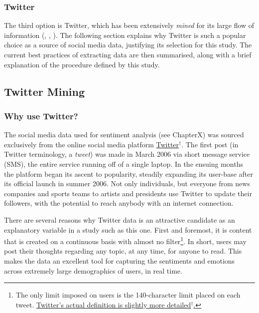 \documentclass{article}
\begin{document}
\subsubsection{Twitter}
\label{sec-1-1-3}
The third option is Twitter, which has been extensively \emph{mined} for its large flow of information (\cite{pak2010twitterMiningEx1}, \cite{bian2012towardsMiningEx2}, \cite{ediger2010massiveMiningEx3}). The following section explains why Twitter is such a popular choice as a source of social media data, justifying its selection for this study. The current best practices of extracting data are then summarised, along with a brief explanation of the procedure defined by this study.


\subsection{Twitter Mining}
\label{sec-1-2}


\subsubsection{Why use Twitter?}
\label{sec-1-2-1}

The social media data used for sentiment analysis (see ChapterX) was sourced exclusively from the online social media platform \href{https://twitter.com/}{Twitter$^{\dag{}}$}. The first post (in Twitter terminology, a \emph{tweet}) was made in March 2006 via short message service (SMS), the entire service running off of a single laptop. In the ensuing months the platform began its ascent to popularity, steadily expanding its user-base after its official launch in summer 2006. Not only individuals, but everyone from news companies and sports teams to artists and presidents use Twitter to update their followers, with the potential to reach anybody with an internet connection.

There are several reasons why Twitter data is an attractive candidate as an explanatory variable in a study such as this one. First and foremost, it is content that is created on a continuous basis with almost no filter\footnote{The only limit imposed on users is the 140-character limit placed on each tweet. \href{https://dev.twitter.com/overview/api/counting-characters}{Twitter's actual definition is slightly more detailed$^{\dag{}}$.}}. In short, users may post their thoughts regarding any topic, at any time, for anyone to read. This makes the data an excellent tool for capturing the sentiments and emotions across extremely large demographics of users, in real time.
\end{document}
